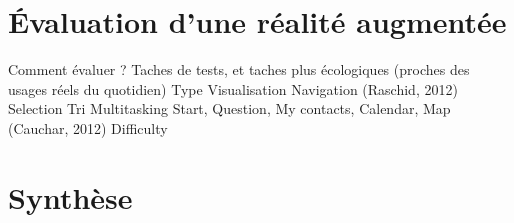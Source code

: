 \section*{Évaluation d'une réalité augmentée}
Comment évaluer ? Taches de tests, et taches plus écologiques (proches des usages réels du quotidien) \cite{DuenserGrassetBillinghurst2008} \cite{DeSaChurchill2013}
    Type
        Visualisation 
        Navigation \cite{EnsFinneganIrani2014} (Raschid, 2012) 
        Selection \cite{EnsFinneganIrani2014}
        Tri \cite{RobertsonCzerwinskiLarsonEtAl1998}
        Multitasking 
            Start, Question, My contacts, Calendar, Map (Cauchar, 2012) \cite{EnsFinneganIrani2014} 
    Difficulty


\section*{Synthèse}